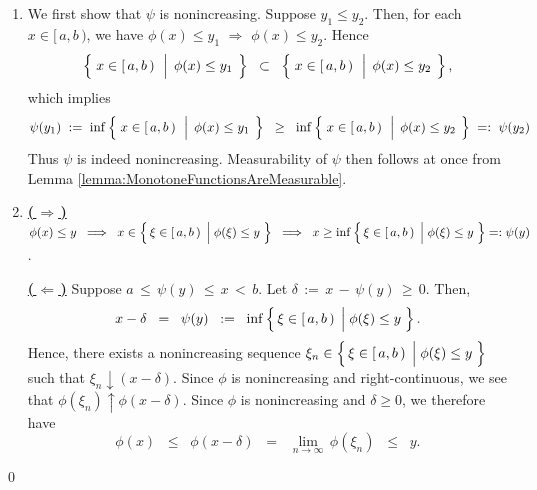 \begin{enumerate}
\item
	We first show that $\psi$ is nonincreasing.
	Suppose $y_{1} \leq y_{2}$. Then, for each $x \in [\,a,b\,)$, we have
	$\phi(x) \leq y_{1}$ $\Longrightarrow$ $\phi(x) \leq y_{2}$.
	Hence
	\begin{equation*}
	\left\{\;
		x \in [\,a,b\,)
		\,\;\left\vert\;\,
			\overset{{\color{white}.}}{\phi}(x) \leq y_{1}
		\right.
		\;\right\}
	\;\; \subset \;\;
	\left\{\;
		x \in [\,a,b\,)
		\,\;\left\vert\;\,
			\overset{{\color{white}.}}{\phi}(x) \leq y_{2}
		\right.
		\;\right\},
	\end{equation*}
	which implies
	\begin{equation*}
	\psi(y_{1}) \; := \;
	\inf\left\{\;
		x \in [\,a,b\,)
		\,\;\left\vert\;\,
			\overset{{\color{white}.}}{\phi}(x) \leq y_{1}
		\right.
		\;\right\}
	\;\; \geq \;\;
	\inf\left\{\;
		x \in [\,a,b\,)
		\,\;\left\vert\;\,
			\overset{{\color{white}.}}{\phi}(x) \leq y_{2}
		\right.
		\;\right\}
	\; =: \; \psi(y_{2})
	\end{equation*}
	Thus $\psi$ is indeed nonincreasing.
	Measurability of $\psi$ then follows at once from Lemma \ref{lemma:MonotoneFunctionsAreMeasurable}.
\item
	\textbf{\underline{(\,$\Longrightarrow$\,)}}\quad
	$\phi(x) \leq y
	\;\;\Longrightarrow\;\;
		x \in \left\{\,\xi\in[\,a,b\,) \;\left\vert\; \phi(\xi) \overset{{\color{white}.}}{\leq} y\right.\,\right\}
	\;\; \Longrightarrow \;\;
		x \geq \inf\left\{\,\xi\in[\,a,b\,) \;\left\vert\; \phi(\xi) \overset{{\color{white}.}}{\leq} y\right.\,\right\} =: \psi(y)$.

	\vskip 0.2cm
	\noindent
	\textbf{\underline{(\,$\Longleftarrow$\,)}}\quad
	Suppose \;$a \,\leq\, \psi(y) \,\leq\, x \,<\, b$.\;
	Let \;$\delta \,:=\, x \,-\, \psi(y) \,\geq\, 0$. Then,
	\begin{equation*}
	x - \delta \;\;=\;\; \psi(y) \;\;:=\;\; \inf\left\{\,\xi\in[\,a,b\,) \;\left\vert\; \phi(\xi) \overset{{\color{white}.}}{\leq} y\right.\,\right\}.
	\end{equation*}
	Hence, there exists a nonincreasing sequence
	$\xi_{n} \in \left\{\,\xi\in[\,a,b\,) \;\left\vert\; \phi(\xi) \overset{{\color{white}.}}{\leq} y\right.\,\right\}$
	such that $\xi_{n} \downarrow (x-\delta)$.
	Since $\phi$ is {\color{red}nonincreasing and right-continuous}, we see that $\phi(\xi_{n}) \uparrow \phi(x-\delta)$.
	Since $\phi$ is nonincreasing and $\delta \geq 0$, we therefore have
	\begin{equation*}
	\phi(x) \;\;\leq\;\; \phi(x-\delta) \;\;=\;\; \underset{n\rightarrow\infty}{\lim}\,\phi(\xi_{n}) \;\;\leq\;\; y.
	\end{equation*}
\end{enumerate}
\qed


\renewcommand{\theenumi}{\roman{enumi}}
\renewcommand{\labelenumi}{\textnormal{(\theenumi)}$\;\;$}

